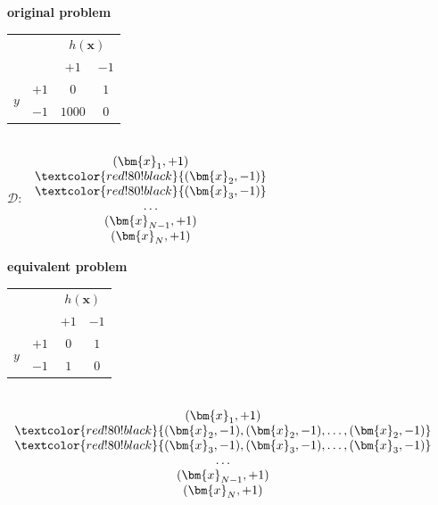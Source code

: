 \begin{center}
    \begin{minipage}[t]{0.44\textwidth}
        \centering
        \textbf{original problem}\\[3pt]
        \solidrules
        \begin{tabular}{@{}cc|cc@{}}
            \toprule
            & & \multicolumn{2}{c}{\(h(\bm{x})\)}\\
            & & \(+1\) & \(-1\)\\
            \midrule
            \multirow{2}{*}{\(y\)} & \(+1\) & \(0\) & \(1\)\\
            & \(-1\) & \textcolor{orange!85!black}{\(1000\)} & \(0\)\\
            \bottomrule
        \end{tabular}\\[6pt]
        \(\mathcal{D}\colon\)
        \(\begin{array}{c}
            (\bm{x}_1, +1)\\
            \textcolor{red!80!black}{(\bm{x}_2, -1)}\\
            \textcolor{red!80!black}{(\bm{x}_3, -1)}\\
            \dots\\
            (\bm{x}_{N-1}, +1)\\
            (\bm{x}_N, +1)
        \end{array}\)
    \end{minipage}
    \begin{minipage}[t]{0.54\textwidth}
        \centering
        \textbf{equivalent problem}\\[3pt]
        \solidrules
        \begin{tabular}{@{}cc|cc@{}}
            \toprule
            & & \multicolumn{2}{c}{\(h(\bm{x})\)}\\
            & & \(+1\) & \(-1\)\\
            \midrule
            \multirow{2}{*}{\(y\)} & \(+1\) & \(0\) & \(1\)\\
            & \(-1\) & \(1\) & \(0\)\\
            \bottomrule
        \end{tabular}\\[6pt]
        \(\begin{array}{c}
            (\bm{x}_1, +1)\\
            \textcolor{red!80!black}{(\bm{x}_2, -1), (\bm{x}_2, -1), \dots ,
            (\bm{x}_2, -1)}\\
            \textcolor{red!80!black}{(\bm{x}_3, -1), (\bm{x}_3, -1), \dots ,
            (\bm{x}_3, -1)}\\
            \dots\\
            (\bm{x}_{N-1}, +1)\\
            (\bm{x}_N, +1)
        \end{array}\)
    \end{minipage}
\end{center}

